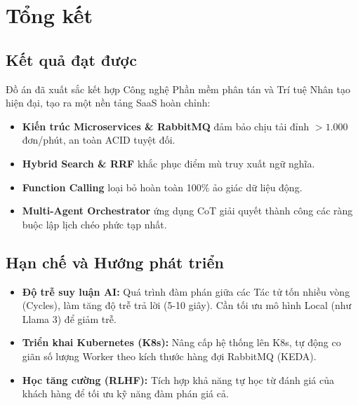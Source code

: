 \section{Tổng kết}

\subsection{Kết quả đạt được}
Đồ án đã xuất sắc kết hợp Công nghệ Phần mềm phân tán và Trí tuệ Nhân tạo hiện đại, tạo ra một nền tảng SaaS hoàn chỉnh:
\begin{itemize}
    \item \textbf{Kiến trúc Microservices \& RabbitMQ} đảm bảo chịu tải đỉnh $>1.000$ đơn/phút, an toàn ACID tuyệt đối.
    \item \textbf{Hybrid Search \& RRF} khắc phục điểm mù truy xuất ngữ nghĩa.
    \item \textbf{Function Calling} loại bỏ hoàn toàn 100\% ảo giác dữ liệu động.
    \item \textbf{Multi-Agent Orchestrator} ứng dụng CoT giải quyết thành công các ràng buộc lập lịch chéo phức tạp nhất.
\end{itemize}

\subsection{Hạn chế và Hướng phát triển}
\begin{itemize}
    \item \textbf{Độ trễ suy luận AI:} Quá trình đàm phán giữa các Tác tử tốn nhiều vòng (Cycles), làm tăng độ trễ trả lời (5-10 giây). Cần tối ưu mô hình Local (như Llama 3) để giảm trễ.
    \item \textbf{Triển khai Kubernetes (K8s):} Nâng cấp hệ thống lên K8s, tự động co giãn số lượng Worker theo kích thước hàng đợi RabbitMQ (KEDA).
    \item \textbf{Học tăng cường (RLHF):} Tích hợp khả năng tự học từ đánh giá của khách hàng để tối ưu kỹ năng đàm phán giá cả.
\end{itemize}
